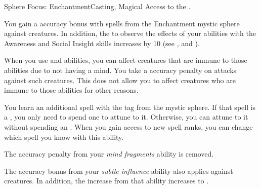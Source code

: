     \begin{feat}{Sphere Focus: Enchantment}{Casting, Magical}
        \featpre Access to the  .

         You gain a  accuracy bonus with spells from the Enchantment mystic sphere against \unaware creatures.
        In addition, the  to observe the effects of your  abilities with the Awareness and Social Insight skills increases by 10 (see , and ).

         When you use  and  abilities, you can affect creatures that are immune to those abilities due to not having a mind.
        You take a  accuracy penalty on attacks against such creatures.
        This does not allow you to affect creatures who are immune to those abilities for other reasons.

         You learn an additional spell with the  tag from the  mystic sphere.
        If that spell is a , you only need to spend one  to attune to it.
        Otherwise, you can attune to it without spending an .
        When you gain access to new spell ranks, you can change which spell you know with this ability.

         The accuracy penalty from your \textit{mind fragments} ability is removed.

         The accuracy bonus from your \textit{subtle influence} ability also applies against \partiallyunaware creatures.
        In addition, the  increase from that ability increases to .
    \end{feat}


